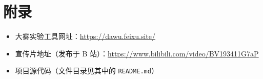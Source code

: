 \section{附录}

\begin{itemize}[nosep]
  \item 大雾实验工具网址：\url{https://dawu.feixu.site/}
  \item 宣传片地址（发布于 B 站）：\url{https://www.bilibili.com/video/BV193411G7aP}
  \item 项目源代码（文件目录见其中的 \verb|README.md|）
\end{itemize}